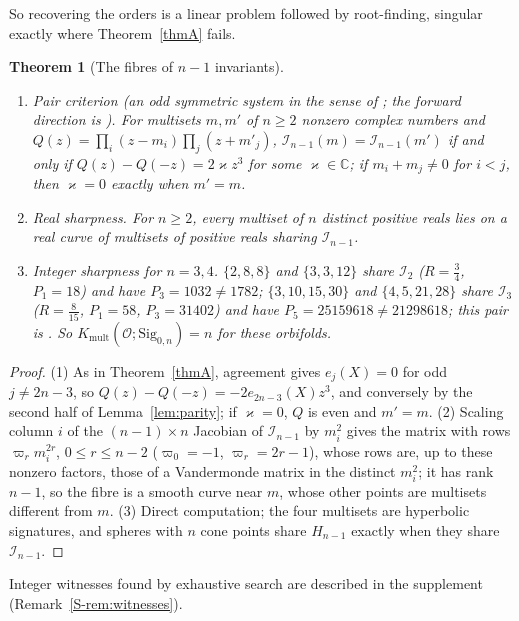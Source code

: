 \documentclass[pdflatex,sn-mathphys-num]{sn-jnl}
\theoremstyle{thmstyleone}%
\newtheorem{theorem}{Theorem}[section]%
\theoremstyle{thmstylethree}%
\newcommand{\Orb}{\mathcal{O}}
\newcommand{\Sig}{\mathrm{Sig}}
\newcommand{\Kmult}{K_{\mathrm{mult}}}
\newcommand{\cI}{\mathcal{I}}
\newcommand{\C}{\mathbb{C}}
\newcommand{\sref}[1]{\ref*{S-#1}}%
\begin{document}
So recovering the orders is a linear problem followed by root-finding, singular exactly where Theorem~\ref{thmA} fails.

\begin{theorem}[The fibres of $n-1$ invariants]\label{thmC}
\leavevmode
\begin{enumerate}[label=(\arabic*)]
\item \emph{Pair criterion} (an odd symmetric system in the sense of \cite[\S3]{borweiningalls1994}; the forward direction is \cite[Identity~9 with $m=3$]{chen2025survey}). For multisets $m,m'$ of $n\ge2$ nonzero complex numbers and $Q(z)=\prod_i(z-m_i)\prod_j(z+m'_j)$, $\cI_{n-1}(m)=\cI_{n-1}(m')$ if and only if $Q(z)-Q(-z)=2\varkappa z^3$ for some $\varkappa\in\C$; if $m_i+m_j\ne0$ for $i<j$, then $\varkappa=0$ exactly when $m'=m$.
\item \emph{Real sharpness.} For $n\ge2$, every multiset of $n$ distinct positive reals lies on a real curve of multisets of positive reals sharing $\cI_{n-1}$.
\item \emph{Integer sharpness for $n=3,4$.} $\{2,8,8\}$ and $\{3,3,12\}$ share $\cI_2$ ($R=\frac34$, $P_1=18$) and have $P_3=1032\ne1782$; $\{3,10,15,30\}$ and $\{4,5,21,28\}$ share $\cI_3$ ($R=\frac8{15}$, $P_1=58$, $P_3=31402$) and have $P_5=25159618\ne21298618$; this pair is \cite[(A.685)]{chen2025survey}. So $\Kmult(\Orb;\Sig_{0,n})=n$ for these orbifolds.
\end{enumerate}
\end{theorem}

\begin{proof}
(1) As in Theorem~\ref{thmA}, agreement gives $e_j(X)=0$ for odd $j\ne2n-3$, so $Q(z)-Q(-z)=-2e_{2n-3}(X)z^3$, and conversely by the second half of Lemma~\ref{lem:parity}; if $\varkappa=0$, $Q$ is even and $m'=m$. (2) Scaling column $i$ of the $(n-1)\times n$ Jacobian of $\cI_{n-1}$ by $m_i^2$ gives the matrix with rows $\varpi_rm_i^{2r}$, $0\le r\le n-2$ ($\varpi_0=-1$, $\varpi_r=2r-1$), whose rows are, up to these nonzero factors, those of a Vandermonde matrix in the distinct $m_i^2$; it has rank $n-1$, so the fibre is a smooth curve near $m$, whose other points are multisets different from $m$. (3) Direct computation; the four multisets are hyperbolic signatures, and spheres with $n$ cone points share $H_{n-1}$ exactly when they share $\cI_{n-1}$.
\end{proof}

Integer witnesses found by exhaustive search are described in the supplement (Remark~\sref{rem:witnesses}).
\end{document}
